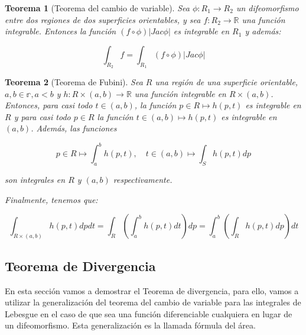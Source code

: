 \documentclass[paper=a4, fontsize=11pt, spanish]{scrartcl}
\newtheorem{theorem}{Teorema}[section]
\theoremstyle{definition}
\theoremstyle{definition}
\theoremstyle{definition}
\begin{document}
\begin{theorem}[Teorema del cambio de variable]
Sea $\phi:R_1 \longrightarrow R_2$ un difeomorfismo entre dos regiones de dos superficies orientables, y sea $f: R_2 \longrightarrow \mathbb{R}$ una función integrable. Entonces la función $(f \circ \phi)|Jac \phi|$ es integrable en $R_1$ y además:

\begin{equation*}
    \int_{R_2} f = \int_{R_1} (f \circ \phi)|Jac \phi|
\end{equation*}
\end{theorem}

\begin{theorem}[Teorema de Fubini]
Sea $R$ una región de una superficie orientable, $a,b \in \mathbb{r}, a < b$ y $h:R \times (a,b) \longrightarrow \mathbb{R}$ una función integrable en $R \times (a,b)$. Entonces, para casi todo $t \in (a,b)$, la función $p \in R \mapsto h(p,t)$ es integrable en $R$ y para casi todo $p \in R$ la función $t \in (a,b) \mapsto h(p,t)$ es integrable en $(a,b)$. Además, las funciones

\begin{equation*}
    p \in R \mapsto \int_a^b h(p,t), \quad  t \in (a,b) \mapsto \int_S h(p,t) dp
\end{equation*}

son integrales en $R$ y $(a,b)$ respectivamente.

Finalmente, tenemos que:

\begin{equation*}
    \int_{R \times (a,b)} h(p,t) dpdt = \int_R \left( \int_a^b h(p,t)dt \right) dp = \int_a^b \left( \int_R h(p,t)dp \right) dt
\end{equation*}
\end{theorem}


\subsection{Teorema de Divergencia}
En esta sección vamos a demostrar el Teorema de divergencia, para ello, vamos a utilizar la generalización del teorema del cambio de variable para las integrales de Lebesgue en el caso de que sea una función diferenciable cualquiera en lugar de un difeomorfismo. Esta generalización es la llamada fórmula del área.
\end{document}
